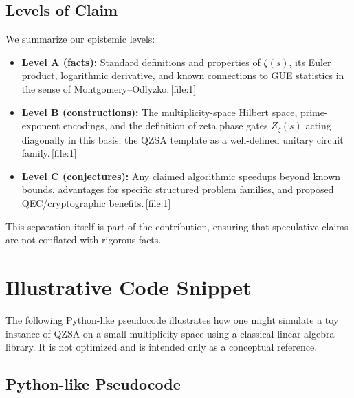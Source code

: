 \documentclass[11pt]{article}
\begin{document}
\subsection{Levels of Claim}

We summarize our epistemic levels:

\begin{itemize}[leftmargin=*]
    \item \textbf{Level A (facts):} Standard definitions and properties of \(\zeta(s)\), its Euler product, logarithmic derivative, and known connections to GUE statistics in the sense of Montgomery--Odlyzko.\,[file:1]
    \item \textbf{Level B (constructions):} The multiplicity-space Hilbert space, prime-exponent encodings, and the definition of zeta phase gates \(Z_\zeta(s)\) acting diagonally in this basis; the QZSA template as a well-defined unitary circuit family.\,[file:1]
    \item \textbf{Level C (conjectures):} Any claimed algorithmic speedups beyond known bounds, advantages for specific structured problem families, and proposed QEC/cryptographic benefits.\,[file:1]
\end{itemize}

This separation itself is part of the contribution, ensuring that speculative claims are not conflated with rigorous facts.

\section{Illustrative Code Snippet}
\label{sec:code-snippet}

The following Python-like pseudocode illustrates how one might simulate a toy instance of QZSA on a small multiplicity space using a classical linear algebra library. It is not optimized and is intended only as a conceptual reference.

\subsection*{Python-like Pseudocode}
\end{document}
